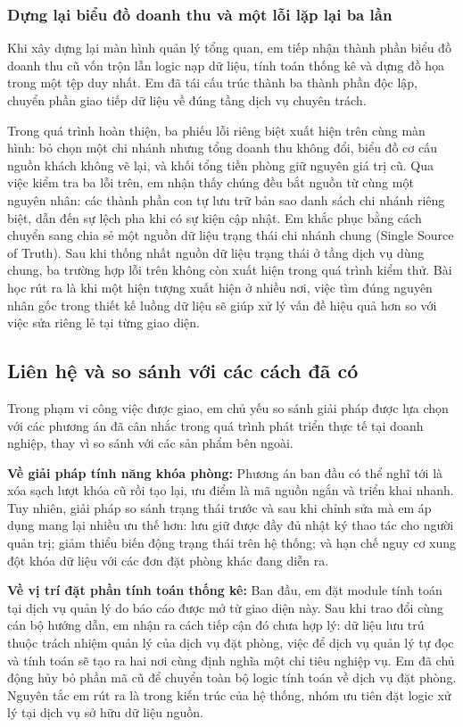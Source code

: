 \subsubsection{Dựng lại biểu đồ doanh thu và một lỗi lặp lại ba lần}

Khi xây dựng lại màn hình quản lý tổng quan, em tiếp nhận thành phần biểu đồ doanh thu cũ vốn trộn lẫn logic nạp dữ liệu, tính toán thống kê và dựng đồ họa trong một tệp duy nhất. Em đã tái cấu trúc thành ba thành phần độc lập, chuyển phần giao tiếp dữ liệu về đúng tầng dịch vụ chuyên trách.

Trong quá trình hoàn thiện, ba phiếu lỗi riêng biệt xuất hiện trên cùng màn hình: bỏ chọn một chi nhánh nhưng tổng doanh thu không đổi, biểu đồ cơ cấu nguồn khách không vẽ lại, và khối tổng tiền phòng giữ nguyên giá trị cũ. Qua việc kiểm tra ba lỗi trên, em nhận thấy chúng đều bắt nguồn từ cùng một nguyên nhân: các thành phần con tự lưu trữ bản sao danh sách chi nhánh riêng biệt, dẫn đến sự lệch pha khi có sự kiện cập nhật. Em khắc phục bằng cách chuyển sang chia sẻ một nguồn dữ liệu trạng thái chi nhánh chung (Single Source of Truth). Sau khi thống nhất nguồn dữ liệu trạng thái ở tầng dịch vụ dùng chung, ba trường hợp lỗi trên không còn xuất hiện trong quá trình kiểm thử. Bài học rút ra là khi một hiện tượng xuất hiện ở nhiều nơi, việc tìm đúng nguyên nhân gốc trong thiết kế luồng dữ liệu sẽ giúp xử lý vấn đề hiệu quả hơn so với việc sửa riêng lẻ tại từng giao diện.

\subsection{Liên hệ và so sánh với các cách đã có}

Trong phạm vi công việc được giao, em chủ yếu so sánh giải pháp được lựa chọn với các phương án đã cân nhắc trong quá trình phát triển thực tế tại doanh nghiệp, thay vì so sánh với các sản phẩm bên ngoài.

\textbf{Về giải pháp tính năng khóa phòng:} Phương án ban đầu có thể nghĩ tới là xóa sạch lượt khóa cũ rồi tạo lại, ưu điểm là mã nguồn ngắn và triển khai nhanh. Tuy nhiên, giải pháp so sánh trạng thái trước và sau khi chỉnh sửa mà em áp dụng mang lại nhiều ưu thế hơn: lưu giữ được đầy đủ nhật ký thao tác cho người quản trị; giảm thiểu biến động trạng thái trên hệ thống; và hạn chế nguy cơ xung đột khóa dữ liệu với các đơn đặt phòng khác đang diễn ra.

\textbf{Về vị trí đặt phần tính toán thống kê:} Ban đầu, em đặt module tính toán tại dịch vụ quản lý do báo cáo được mở từ giao diện này. Sau khi trao đổi cùng cán bộ hướng dẫn, em nhận ra cách tiếp cận đó chưa hợp lý: dữ liệu lưu trú thuộc trách nhiệm quản lý của dịch vụ đặt phòng, việc để dịch vụ quản lý tự đọc và tính toán sẽ tạo ra hai nơi cùng định nghĩa một chỉ tiêu nghiệp vụ. Em đã chủ động hủy bỏ phần mã cũ để chuyển toàn bộ logic tính toán về dịch vụ đặt phòng. Nguyên tắc em rút ra là trong kiến trúc của hệ thống, nhóm ưu tiên đặt logic xử lý tại dịch vụ sở hữu dữ liệu nguồn.

